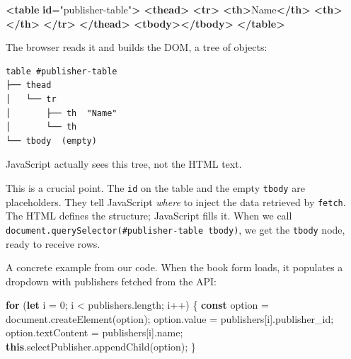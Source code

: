 \documentclass[11pt,a4paper,oneside]{book}
\newenvironment{Shaded}{\begin{snugshade}}{\end{snugshade}}
\newcommand{\KeywordTok}[1]{\textcolor[HTML]{007020}{\textbf{#1}}}
\newcommand{\DecValTok}[1]{\textcolor[HTML]{40A070}{#1}}
\newcommand{\StringTok}[1]{\textcolor[HTML]{4070A0}{#1}}
\newcommand{\OtherTok}[1]{\textcolor[HTML]{007020}{#1}}
\newcommand{\FunctionTok}[1]{\textcolor[HTML]{06287E}{#1}}
\newcommand{\ControlFlowTok}[1]{\textcolor[HTML]{007020}{\textbf{#1}}}
\newcommand{\OperatorTok}[1]{\textcolor[HTML]{666666}{#1}}
\newcommand{\BuiltInTok}[1]{#1}
\newcommand{\AttributeTok}[1]{\textcolor[HTML]{7D9029}{#1}}
\newcommand{\ErrorTok}[1]{\textcolor[HTML]{FF0000}{\textbf{#1}}}
\newcommand{\NormalTok}[1]{#1}
\begin{document}
\begin{Shaded}
\begin{Highlighting}[]
\KeywordTok{\textless{}table} \ErrorTok{id}\OtherTok{=}\StringTok{"publisher{-}table"}\KeywordTok{\textgreater{}}
    \KeywordTok{\textless{}thead\textgreater{}}
        \KeywordTok{\textless{}tr\textgreater{}}
            \KeywordTok{\textless{}th\textgreater{}}\NormalTok{Name}\KeywordTok{\textless{}/th\textgreater{}}
            \KeywordTok{\textless{}th\textgreater{}\textless{}/th\textgreater{}}
        \KeywordTok{\textless{}/tr\textgreater{}}
    \KeywordTok{\textless{}/thead\textgreater{}}
    \KeywordTok{\textless{}tbody\textgreater{}\textless{}/tbody\textgreater{}}
\KeywordTok{\textless{}/table\textgreater{}}
\end{Highlighting}
\end{Shaded}

The browser reads it and builds the DOM, a tree of objects:

\begin{verbatim}
table #publisher-table
├── thead
│   └── tr
│       ├── th  "Name"
│       └── th
└── tbody  (empty)
\end{verbatim}

JavaScript actually sees this tree, not the HTML text.

This is a crucial point. The \texttt{id} on the table and the
empty \texttt{tbody} are placeholders. They tell JavaScript
\emph{where} to inject the data retrieved by \texttt{fetch}. The
HTML defines the structure; JavaScript fills it. When we call
\texttt{document.querySelector(\textquotesingle{}\#publisher-table\ tbody\textquotesingle{})},
we get the \texttt{tbody} node, ready to receive rows.

A concrete example from our code. When the book form loads, it
populates a dropdown with publishers fetched from the API:

\begin{Shaded}
\begin{Highlighting}[]
\ControlFlowTok{for}\NormalTok{ (}\KeywordTok{let}\NormalTok{ i }\OperatorTok{=} \DecValTok{0}\OperatorTok{;}\NormalTok{ i }\OperatorTok{\textless{}}\NormalTok{ publishers}\OperatorTok{.}\AttributeTok{length}\OperatorTok{;}\NormalTok{ i}\OperatorTok{++}\NormalTok{) \{}
    \KeywordTok{const}\NormalTok{ option }\OperatorTok{=} \BuiltInTok{document}\OperatorTok{.}\FunctionTok{createElement}\NormalTok{(}\StringTok{\textquotesingle{}option\textquotesingle{}}\NormalTok{)}\OperatorTok{;}
\NormalTok{    option}\OperatorTok{.}\AttributeTok{value} \OperatorTok{=}\NormalTok{ publishers[i]}\OperatorTok{.}\AttributeTok{publisher\_id}\OperatorTok{;}
\NormalTok{    option}\OperatorTok{.}\AttributeTok{textContent} \OperatorTok{=}\NormalTok{ publishers[i]}\OperatorTok{.}\AttributeTok{name}\OperatorTok{;}
    \KeywordTok{this}\OperatorTok{.}\AttributeTok{selectPublisher}\OperatorTok{.}\FunctionTok{appendChild}\NormalTok{(option)}\OperatorTok{;}
\NormalTok{\}}
\end{Highlighting}
\end{Shaded}
\end{document}
